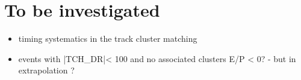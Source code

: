 

\section{To be investigated} 


\begin{itemize}
\item 
  timing systematics in the track cluster matching
\item 
  events with |TCH\_DR|< 100 and no associated clusters E/P < 0? - but in extrapolation ?
\end{itemize}
